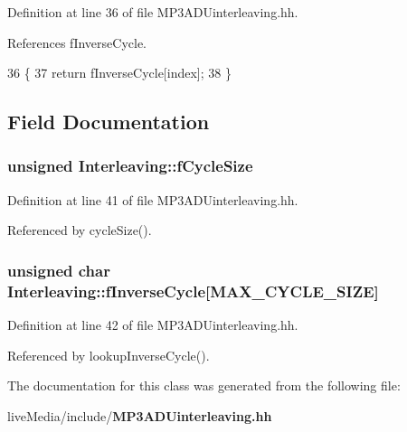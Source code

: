 Definition at line 36 of file M\+P3\+A\+D\+Uinterleaving.\+hh.



References f\+Inverse\+Cycle.


\begin{DoxyCode}
36                                                               \{
37     \textcolor{keywordflow}{return} fInverseCycle[index];
38   \}
\end{DoxyCode}


\subsection{Field Documentation}
\subsubsection[{f\+Cycle\+Size}]{\setlength{\rightskip}{0pt plus 5cm}unsigned Interleaving\+::f\+Cycle\+Size\hspace{0.3cm}{\ttfamily [private]}}\label{classInterleaving_aff01e0fbe20f98df1d1992cadd1e38ff}


Definition at line 41 of file M\+P3\+A\+D\+Uinterleaving.\+hh.



Referenced by cycle\+Size().

\subsubsection[{f\+Inverse\+Cycle}]{\setlength{\rightskip}{0pt plus 5cm}unsigned char Interleaving\+::f\+Inverse\+Cycle[{\bf M\+A\+X\+\_\+\+C\+Y\+C\+L\+E\+\_\+\+S\+I\+Z\+E}]\hspace{0.3cm}{\ttfamily [private]}}\label{classInterleaving_abbdc691d34cb82572a0d91cdbc0fe798}


Definition at line 42 of file M\+P3\+A\+D\+Uinterleaving.\+hh.



Referenced by lookup\+Inverse\+Cycle().



The documentation for this class was generated from the following file\+:\begin{DoxyCompactItemize}
\item 
live\+Media/include/{\bf M\+P3\+A\+D\+Uinterleaving.\+hh}\end{DoxyCompactItemize}
